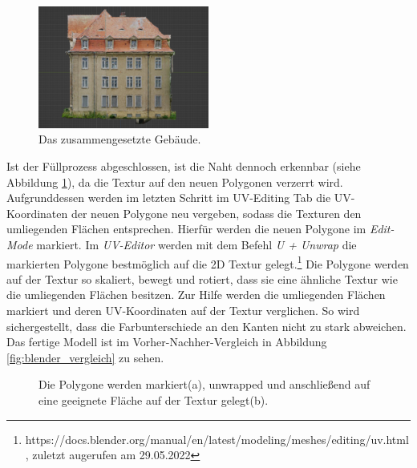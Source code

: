 \begin{figure}[hbt!]
    \centering
    \includegraphics[width=0.5\textwidth]{img/vorbereitungen_blender_modelle/g2_naht.jpg}
    \caption{Das zusammengesetzte Gebäude.}
    \label{fig:blender_naht}
\end{figure}

Ist der Füllprozess abgeschlossen, ist die Naht dennoch erkennbar (siehe Abbildung \ref*{fig:blender_naht}), da die Textur auf den neuen Polygonen verzerrt wird. Aufgrunddessen werden im letzten Schritt im UV-Editing Tab die UV-Koordinaten der neuen Polygone neu vergeben, sodass die Texturen den umliegenden Flächen entsprechen. Hierfür werden die neuen Polygone im \textit{Edit-Mode} markiert. Im \textit{UV-Editor} werden mit dem Befehl \textit{U + Unwrap} die markierten Polygone bestmöglich auf die 2D Textur gelegt.\footnote{https://docs.blender.org/manual/en/latest/modeling/meshes/editing/uv.html, zuletzt augerufen am 29.05.2022} Die Polygone werden auf der Textur so skaliert, bewegt und rotiert, dass sie eine ähnliche Textur wie die umliegenden Flächen besitzen. Zur Hilfe werden die umliegenden Flächen markiert und deren UV-Koordinaten auf der Textur verglichen. So wird sichergestellt, dass die Farbunterschiede an den Kanten nicht zu stark abweichen. Das fertige Modell ist im Vorher-Nachher-Vergleich in Abbildung \ref*{fig:blender_vergleich} zu sehen. 

\begin{figure}[hbt!]
    \centering
    \qquad
    \caption{Die Polygone werden markiert(a), unwrapped und anschließend auf eine geeignete Fläche auf der Textur gelegt(b).}%
    \label{fig:blender_uv_editing}
\end{figure}

